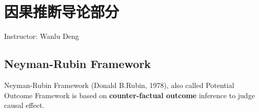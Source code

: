 \section{因果推断导论部分}\label{SecCausalInference}
\begin{center}
    Instructor: Wanlu Deng
\end{center}



\subsection{Neyman-Rubin Framework}
    Neyman-Rubin Framework (Donald B.Rubin, 1978), also called Potential Outcome Framework is based on \textbf{counter-factual outcome} inference to judge causal effect. 


    
    
        

